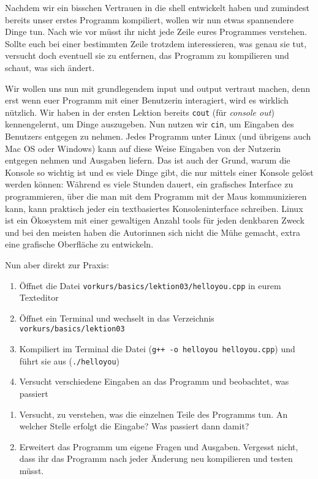 
Nachdem wir ein bisschen Vertrauen in die shell entwickelt haben und zumindest
bereits unser erstes Programm kompiliert, wollen wir nun etwas spannendere
Dinge tun. Nach wie vor müsst ihr nicht jede Zeile eures Programmes verstehen.
Sollte euch bei einer bestimmten Zeile trotzdem interessieren, was genau sie
tut, versucht doch eventuell sie zu entfernen, das Programm zu kompilieren und
schaut, was sich ändert.

Wir wollen uns nun mit grundlegendem input und output vertraut machen, denn
erst wenn euer Programm mit einer Benutzerin interagiert, wird es wirklich
nützlich. Wir haben in der ersten Lektion bereits \texttt{cout} (für
\emph{console out}) kennengelernt, um Dinge auszugeben. Nun nutzen wir
\texttt{cin}, um Eingaben des Benutzers entgegen zu nehmen. Jedes Programm
unter Linux (und übrigens auch Mac OS oder Windows) kann auf diese Weise
Eingaben von der Nutzerin entgegen nehmen und Ausgaben liefern. Das ist auch
der Grund, warum die Konsole so wichtig ist und es viele Dinge gibt, die nur
mittels einer Konsole gelöst werden können: Während es viele Stunden dauert,
ein grafisches Interface zu programmieren, über die man mit dem Programm mit
der Maus kommunizieren kann, kann praktisch jeder ein textbasiertes
Konsoleninterface schreiben. Linux ist ein Ökosystem mit einer gewaltigen
Anzahl tools für jeden denkbaren Zweck und bei den meisten haben die Autorinnen
sich nicht die Mühe gemacht, extra eine grafische Oberfläche zu entwickeln.

Nun aber direkt zur Praxis:

\begin{praxis}
    \begin{enumerate}
        \item Öffnet die Datei \texttt{vorkurs/basics/lektion03/helloyou.cpp} in eurem Texteditor
        \item Öffnet ein Terminal und wechselt in das Verzeichnis \texttt{vorkurs/basics/lektion03}
        \item Kompiliert im Terminal die Datei (\texttt{g++ -o helloyou
                  helloyou.cpp}) und führt sie aus (\texttt{./helloyou})
        \item Versucht verschiedene Eingaben an das Programm und beobachtet, was passiert
    \end{enumerate}

\end{praxis}

\begin{spiel}
    \begin{enumerate}
        \item Versucht, zu verstehen, was die einzelnen Teile des Programms tun. An
              welcher Stelle erfolgt die Eingabe? Was passiert dann damit?
        \item Erweitert das Programm um eigene Fragen und Ausgaben. Vergesst nicht,
              dass ihr das Programm nach jeder Änderung neu kompilieren und testen
              müsst.
    \end{enumerate}
\end{spiel}
